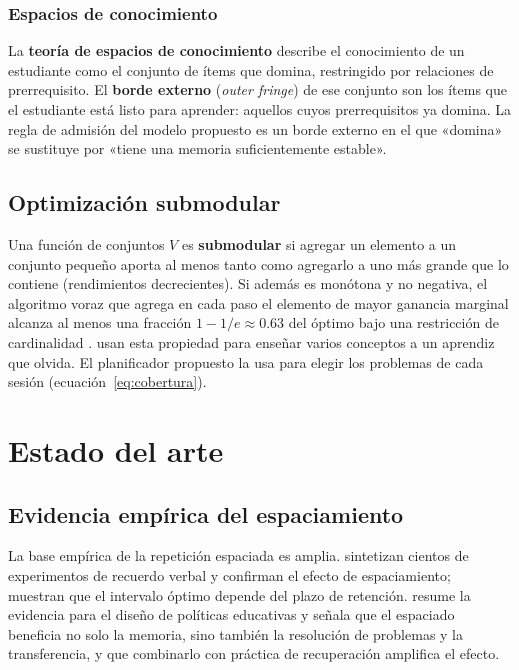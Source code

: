 \documentclass[12pt]{article}
\theoremstyle{definition}
\begin{document}
\subsubsection{Espacios de conocimiento}

La \textbf{teoría de espacios de conocimiento} \citep{doignon1985} describe el conocimiento de un estudiante como el conjunto de ítems que domina, restringido por relaciones de prerrequisito. El \textbf{borde externo} (\emph{outer fringe}) de ese conjunto son los ítems que el estudiante está listo para aprender: aquellos cuyos prerrequisitos ya domina. La regla de admisión del modelo propuesto es un borde externo en el que «domina» se sustituye por «tiene una memoria suficientemente estable».

\subsection{Optimización submodular}

Una función de conjuntos $V$ es \textbf{submodular} si agregar un elemento a un conjunto pequeño aporta al menos tanto como agregarlo a uno más grande que lo contiene (rendimientos decrecientes). Si además es monótona y no negativa, el algoritmo voraz que agrega en cada paso el elemento de mayor ganancia marginal alcanza al menos una fracción $1-1/e\approx0.63$ del óptimo bajo una restricción de cardinalidad \citep{nemhauser1978}. \citet{hunziker2019} usan esta propiedad para enseñar varios conceptos a un aprendiz que olvida. El planificador propuesto la usa para elegir los problemas de cada sesión (ecuación~\ref{eq:cobertura}).

\section{Estado del arte}
\label{sec:estado}

\subsection{Evidencia empírica del espaciamiento}

La base empírica de la repetición espaciada es amplia. \citet{cepeda2006} sintetizan cientos de experimentos de recuerdo verbal y confirman el efecto de espaciamiento; \citet{cepeda2008} muestran que el intervalo óptimo depende del plazo de retención. \citet{kang2016} resume la evidencia para el diseño de políticas educativas y señala que el espaciado beneficia no solo la memoria, sino también la resolución de problemas y la transferencia, y que combinarlo con práctica de recuperación amplifica el efecto.
\end{document}
